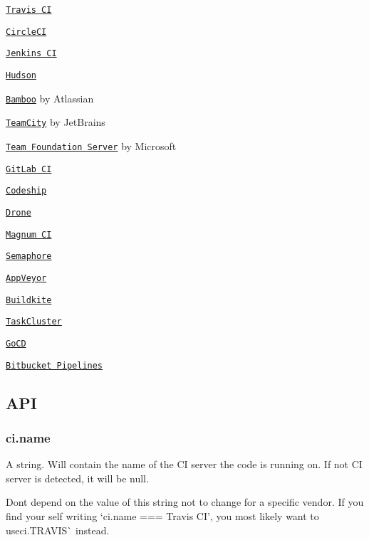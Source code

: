 \begin{DoxyItemize}
\item \href{http://travis-ci.org}{\tt Travis CI}
\item \href{http://circleci.com}{\tt Circle\+CI}
\item \href{https://jenkins-ci.org}{\tt Jenkins CI}
\item \href{http://hudson-ci.org}{\tt Hudson}
\item \href{https://www.atlassian.com/software/bamboo}{\tt Bamboo} by Atlassian
\item \href{https://www.jetbrains.com/teamcity/}{\tt Team\+City} by Jet\+Brains
\item \href{https://www.visualstudio.com/en-us/products/tfs-overview-vs.aspx}{\tt Team Foundation Server} by Microsoft
\item \href{https://about.gitlab.com/gitlab-ci/}{\tt Git\+Lab CI}
\item \href{https://codeship.com}{\tt Codeship}
\item \href{https://drone.io}{\tt Drone}
\item \href{https://magnum-ci.com}{\tt Magnum CI}
\item \href{https://semaphoreci.com}{\tt Semaphore}
\item \href{http://www.appveyor.com}{\tt App\+Veyor}
\item \href{https://buildkite.com}{\tt Buildkite}
\item \href{http://docs.taskcluster.net}{\tt Task\+Cluster}
\item \href{https://www.go.cd/}{\tt Go\+CD}
\item \href{https://bitbucket.org/product/features/pipelines}{\tt Bitbucket Pipelines}
\end{DoxyItemize}

\subsection*{A\+PI}

\subsubsection*{{\ttfamily ci.\+name}}

A string. Will contain the name of the CI server the code is running on. If not CI server is detected, it will be {\ttfamily null}.

Don\textquotesingle{}t depend on the value of this string not to change for a specific vendor. If you find your self writing `ci.\+name === \textquotesingle{}Travis CI'{\ttfamily , you most likely want to use}ci.\+T\+R\+A\+V\+IS\`{} instead.


